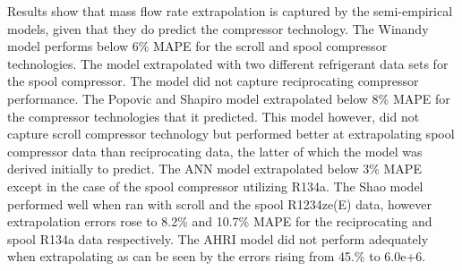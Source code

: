 \documentclass[preprint,11pt,authoryear]{elsarticle}
\begin{document}
\begin{table}[h]
\caption{Mass flow rate MAPE's under extrapolation scenarios.}
\label{Tab:extrp_mdot_results}
\begin{center}
\end{center}
\end{table}

Results show that mass flow rate extrapolation is captured by the semi-empirical models, given that they do predict the compressor technology. The Winandy model performs below 6\% MAPE for the scroll and spool compressor technologies. The model extrapolated with two different refrigerant data sets for the spool compressor. The model did not capture reciprocating compressor performance. The Popovic and Shapiro model extrapolated below 8\% MAPE for the compressor technologies that it predicted. This model however, did not capture scroll compressor technology but performed better at extrapolating spool compressor data than reciprocating data, the latter of which the model was derived initially to predict. The ANN model extrapolated below 3\% MAPE except in the case of the spool compressor utilizing R134a. The Shao model performed well when ran with scroll and the spool R1234ze(E) data, however extrapolation errors rose to 8.2\% and 10.7\% MAPE for the reciprocating and spool R134a data respectively. The AHRI model did not perform adequately when extrapolating as can be seen by the errors rising from 45.\% to 6.0e+6.

\end{document}
